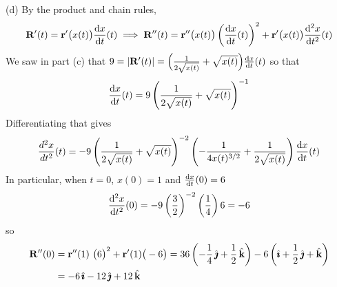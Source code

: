 \begin{solution}
(d)
By the product and chain rules,
\begin{equation*}
\vR'(t)=\vr'\big(x(t)\big)\diff{x}{t}(t)\implies
\vR''(t)=\vr''\big(x(t)\big)\left(\diff{x}{t}(t)\right)^2
+\vr'\big(x(t)\big)\difftwo{x}{t}(t)
\end{equation*}
We saw in part (c) that 
$9=|\vR'(t)|=\Big(\frac{1}{2\sqrt{x(t)}}+\sqrt{x(t)}\Big)\diff{x}{t}(t)$
so that 
\begin{equation*}
\diff{x}{t}(t)=9\left(\frac{1}{2\sqrt{x(t)}}+\sqrt{x(t)}\right)^{-1}
\end{equation*}
Differentiating that gives
\begin{equation*}
\frac{d^2x}{dt^2}(t)=-9\left(\frac{1}{2\sqrt{x(t)}}+\sqrt{x(t)}\right)^{-2}
\left(-\frac{1}{4x(t)^{3/2}}+\frac{1}{2\sqrt{x(t)}}\right)\diff{x}{t}(t)
\end{equation*}
In particular, when $t=0$, $x(0)=1$ and $\diff{x}{t}(0)=6$
\begin{equation*}
\difftwo{x}{t}(0)=-9\left(\frac{3}{2}\right)^{-2}
\left(\frac{1}{4}\right)6=-6
\end{equation*}
so
\begin{align*}
\mathbf{R}''(0)&=\mathbf{r}''(1)\ \big(6\big)^2+\mathbf{r}'(1)\big(-6\big)
=36\left(-\frac{1}{4}\,\hat{\pmb{\jmath}}+\frac{1}{2}\,\hat{\mathbf{k}}\right)
-6\left(\hat{\pmb{\imath}}+\frac{1}{2}\,\hat{\pmb{\jmath}}+\hat{\mathbf{k}}\right) \\
&=-6\,\hat{\pmb{\imath}}-12\,\hat{\pmb{\jmath}}+12\,\hat{\mathbf{k}}
\end{align*}
\end{solution}




